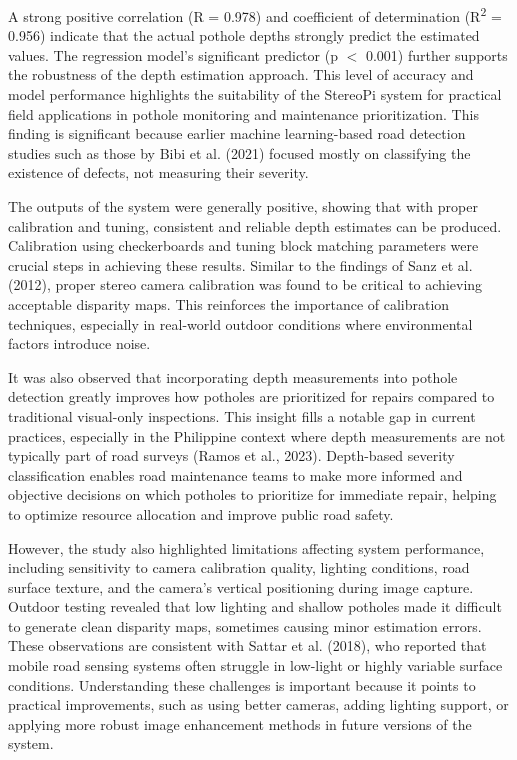 A strong positive correlation (R = 0.978) and coefficient of determination (R\textsuperscript{2} = 0.956) indicate that the actual pothole depths strongly predict the estimated values. The regression model’s significant predictor (p $<$ 0.001) further supports the robustness of the depth estimation approach. This level of accuracy and model performance highlights the suitability of the StereoPi system for practical field applications in pothole monitoring and maintenance prioritization. This finding is significant because earlier machine learning-based road detection studies such as those by Bibi et al. (2021) focused mostly on classifying the existence of defects, not measuring their severity.

The outputs of the system were generally positive, showing that with proper calibration and tuning, consistent and reliable depth estimates can be produced. Calibration using checkerboards and tuning block matching parameters were crucial steps in achieving these results. Similar to the findings of Sanz et al. (2012), proper stereo camera calibration was found to be critical to achieving acceptable disparity maps. This reinforces the importance of calibration techniques, especially in real-world outdoor conditions where environmental factors introduce noise.

It was also observed that incorporating depth measurements into pothole detection greatly improves how potholes are prioritized for repairs compared to traditional visual-only inspections. This insight fills a notable gap in current practices, especially in the Philippine context where depth measurements are not typically part of road surveys (Ramos et al., 2023). Depth-based severity classification enables road maintenance teams to make more informed and objective decisions on which potholes to prioritize for immediate repair, helping to optimize resource allocation and improve public road safety.

However, the study also highlighted limitations affecting system performance, including sensitivity to camera calibration quality, lighting conditions, road surface texture, and the camera's vertical positioning during image capture. Outdoor testing revealed that low lighting and shallow potholes made it difficult to generate clean disparity maps, sometimes causing minor estimation errors. These observations are consistent with Sattar et al. (2018), who reported that mobile road sensing systems often struggle in low-light or highly variable surface conditions. Understanding these challenges is important because it points to practical improvements, such as using better cameras, adding lighting support, or applying more robust image enhancement methods in future versions of the system.
